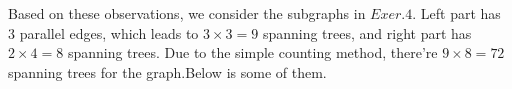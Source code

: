 \documentclass[UTF8]{ctexart}
\begin{document}
    \begin{figure}[h]
        \centering   
    \end{figure}
    Based on these observations, we consider the subgraphs in $Exer.4$. Left part has 3 parallel edges,
    which leads to $3 \times 3 = 9$ spanning trees, and right part has $2 \times 4 = 8$ spanning trees.
    Due to the simple counting method, there're $9 \times 8 = 72$ spanning trees for the graph.Below is some of 
    them.
\end{document}
